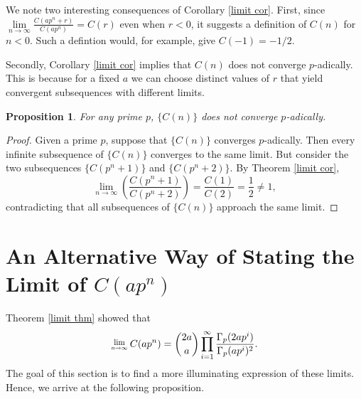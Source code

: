 \documentclass[12pt, letter]{article}    %
\theoremstyle{plain}
\newtheorem{proposition}[theorem]{Proposition}
\theoremstyle{definition}
\newtheorem{definition}[theorem]{Definition}
\numberwithin{equation}{section}
\newcommand{\Lim}[1]{\raisebox{0.5ex}{\scalebox{0.8}{$\displaystyle \lim_{#1}\;$}}}
\newcommand{\integers}{\mathbb{Z}}
\newcommand{\thref}[1]{Theorem \ref{#1}}
\newcommand{\coref}[1]{Corollary \ref{#1}}
\begin{document}
We note two interesting consequences of \coref{limit cor}. First, since $\lim\limits_{n\rightarrow \infty}\frac{C(ap^n+r)}{C(ap^n)}=C(r)$ even when $r<0$, it suggests a definition of $C(n)$ for $n<0$. Such a defintion would, for example, give $C(-1)=-1/2$. 

Secondly, \coref{limit cor} implies that $C(n)$ does not converge $p$-adically. This is because for a fixed $a$ we can choose distinct values of $r$ that yield convergent subsequences with different limits.

\begin{proposition}
For any prime $p$, $\{C(n)\}$ does not converge $p$-adically.

\end{proposition}
\begin{proof}
Given a prime $p$, suppose that $\{C(n)\}$ converges $p$-adically. Then every infinite subsequence of $\{C(n)\}$ converges to the same limit. But consider the two subsequences $\{C(p^n+1)\}$ and $\{C(p^n+2)\}$. By \thref{limit cor}, 
$$\lim\limits_{n\rightarrow \infty}\left(\frac{C(p^n+1)}{C(p^n+2)}\right)=\frac{C(1)}{C(2)}=\frac{1}{2}\neq 1,$$ contradicting that all subsequences of $\{C(n)\}$ approach the same limit.
\end{proof}


\section{An Alternative Way of Stating the Limit of $C(ap^n)$}




\thref{limit thm} showed that 
\begin{equation} \label{limit}
\Lim{n\rightarrow \infty} C(ap^n)=
\binom{2a}{a}\prod_{i=1}^{\infty}\frac{\Gamma_p(2ap^i)}{\Gamma_p(ap^i)^2}.
\end{equation}
The goal of this section is to find a more illuminating expression of these limits. Hence, we arrive at the following proposition.
\end{document}
